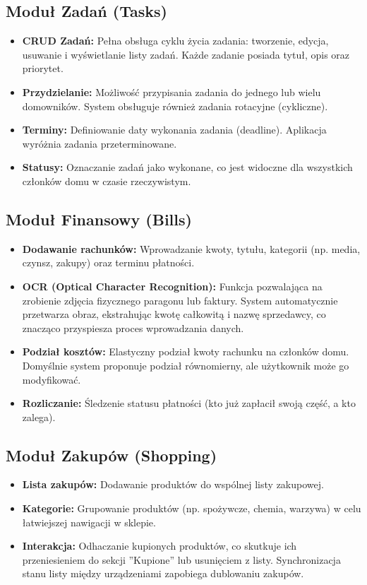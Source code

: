 \subsection{Moduł Zadań (Tasks)}
\begin{itemize}
    \item \textbf{CRUD Zadań:} Pełna obsługa cyklu życia zadania: tworzenie, edycja, usuwanie i wyświetlanie listy zadań. Każde zadanie posiada tytuł, opis oraz priorytet.
    \item \textbf{Przydzielanie:} Możliwość przypisania zadania do jednego lub wielu domowników. System obsługuje również zadania rotacyjne (cykliczne).
    \item \textbf{Terminy:} Definiowanie daty wykonania zadania (deadline). Aplikacja wyróżnia zadania przeterminowane.
    \item \textbf{Statusy:} Oznaczanie zadań jako wykonane, co jest widoczne dla wszystkich członków domu w czasie rzeczywistym.
\end{itemize}

\subsection{Moduł Finansowy (Bills)}
\begin{itemize}
    \item \textbf{Dodawanie rachunków:} Wprowadzanie kwoty, tytułu, kategorii (np. media, czynsz, zakupy) oraz terminu płatności.
    \item \textbf{OCR (Optical Character Recognition):} Funkcja pozwalająca na zrobienie zdjęcia fizycznego paragonu lub faktury. System automatycznie przetwarza obraz, ekstrahując kwotę całkowitą i nazwę sprzedawcy, co znacząco przyspiesza proces wprowadzania danych.
    \item \textbf{Podział kosztów:} Elastyczny podział kwoty rachunku na członków domu. Domyślnie system proponuje podział równomierny, ale użytkownik może go modyfikować.
    \item \textbf{Rozliczanie:} Śledzenie statusu płatności (kto już zapłacił swoją część, a kto zalega).
\end{itemize}

\subsection{Moduł Zakupów (Shopping)}
\begin{itemize}
    \item \textbf{Lista zakupów:} Dodawanie produktów do wspólnej listy zakupowej.
    \item \textbf{Kategorie:} Grupowanie produktów (np. spożywcze, chemia, warzywa) w celu łatwiejszej nawigacji w sklepie.
    \item \textbf{Interakcja:} Odhaczanie kupionych produktów, co skutkuje ich przeniesieniem do sekcji ''Kupione'' lub usunięciem z listy. Synchronizacja stanu listy między urządzeniami zapobiega dublowaniu zakupów.
\end{itemize}

